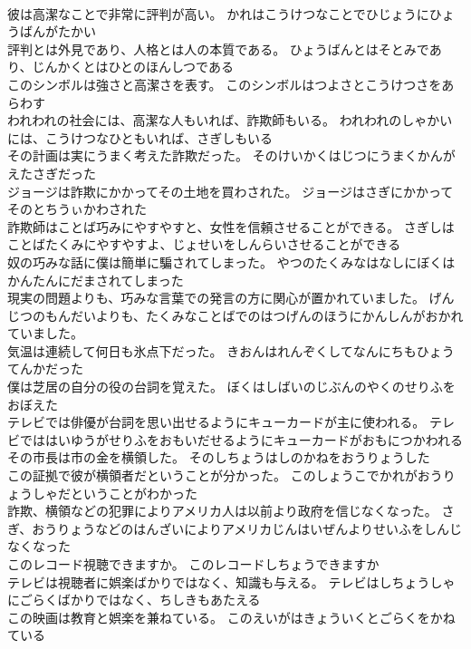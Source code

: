 \documentclass[8pt]{extreport}
\begin{document}
\begin{CJK}{UTF8}{min}
\\	彼は高潔なことで非常に評判が高い。	かれはこうけつなことでひじょうにひょうばんがたかい 
\\	評判とは外見であり、人格とは人の本質である。	ひょうばんとはそとみであり、じんかくとはひとのほんしつである 
\\	このシンボルは強さと高潔さを表す。	このシンボルはつよさとこうけつさをあらわす 
\\	われわれの社会には、高潔な人もいれば、詐欺師もいる。	われわれのしゃかいには、こうけつなひともいれば、さぎしもいる 
\\	その計画は実にうまく考えた詐欺だった。	そのけいかくはじつにうまくかんがえたさぎだった 
\\	ジョージは詐欺にかかってその土地を買わされた。	ジョージはさぎにかかってそのとちうぃかわされた 
\\	詐欺師はことば巧みにやすやすと、女性を信頼させることができる。	さぎしはことばたくみにやすやすよ、じょせいをしんらいさせることができる 
\\	奴の巧みな話に僕は簡単に騙されてしまった。	やつのたくみなはなしにぼくはかんたんにだまされてしまった　 
\\	現実の問題よりも、巧みな言葉での発言の方に関心が置かれていました。	げんじつのもんだいよりも、たくみなことばでのはつげんのほうにかんしんがおかれていました。 
\\	気温は連続して何日も氷点下だった。	きおんはれんぞくしてなんにちもひょうてんかだった 
\\	僕は芝居の自分の役の台詞を覚えた。	ぼくはしばいのじぶんのやくのせりふをおぼえた 
\\	テレビでは俳優が台詞を思い出せるようにキューカードが主に使われる。	テレビでははいゆうがせりふをおもいだせるようにキューカードがおもにつかわれる 
\\	その市長は市の金を横領した。	そのしちょうはしのかねをおうりょうした 
\\	この証拠で彼が横領者だということが分かった。	このしょうこでかれがおうりょうしゃだということがわかった 
\\	詐欺、横領などの犯罪によりアメリカ人は以前より政府を信じなくなった。	さぎ、おうりょうなどのはんざいによりアメリカじんはいぜんよりせいふをしんじなくなった 
\\	このレコード視聴できますか。	このレコードしちょうできますか 
\\	テレビは視聴者に娯楽ばかりではなく、知識も与える。	テレビはしちょうしゃにごらくばかりではなく、ちしきもあたえる 
\\	この映画は教育と娯楽を兼ねている。	このえいがはきょういくとごらくをかねている 

\end{CJK}
\end{document}
